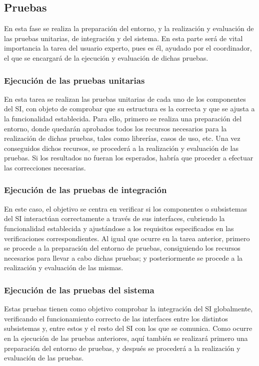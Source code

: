 \documentclass[11pt,a4paper,spanish,twoside]{book}
\begin{document}
\subsection{Pruebas}
En esta fase se realiza la preparación del entorno, y la realización y 
evaluación de las pruebas unitarias, de integración y del sistema. En esta 
parte será de vital importancia la tarea del usuario experto, pues es él, 
ayudado por el coordinador, el que se encargará de la ejecución y evaluación de
dichas pruebas.

\subsubsection{Ejecución de las pruebas unitarias}
En esta tarea se realizan las pruebas unitarias de cada uno de los componentes 
del SI, con objeto de comprobar que su estructura es la correcta y que se 
ajusta a la funcionalidad establecida. Para ello, primero se realiza una 
preparación del entorno, donde quedarán aprobados todos los recursos necesarios
para la realización de dichas pruebas, tales como librerías, casos de uso, etc.
Una vez conseguidos dichos recursos, se procederá a la realización y evaluación
de las pruebas. Si los resultados no fueran los esperados, habría que proceder 
a efectuar las correcciones necesarias.

\subsubsection{Ejecución de las pruebas de integración}
En este caso, el objetivo se centra en verificar si los componentes o 
subsistemas del SI interactúan correctamente a través de sus interfaces, 
cubriendo la funcionalidad establecida y ajustándose a los requisitos 
especificados en las verificaciones correspondientes. Al igual que ocurre en la
tarea anterior, primero se procede a la preparación del entorno de pruebas, 
consiguiendo los recursos necesarios para llevar a cabo dichas pruebas; y 
posteriormente se procede a la realización y evaluación de las mismas.

\subsubsection{Ejecución de las pruebas del sistema}
Estas pruebas tienen como objetivo comprobar la integración del SI globalmente,
verificando el funcionamiento correcto de las interfaces entre los distintos 
subsistemas y, entre estos y el resto del SI con los que se comunica. Como 
ocurre en la ejecución de las pruebas anteriores, aquí también se realizará 
primero una preparación del entorno de pruebas, y después se procederá a la 
realización y evaluación de las pruebas.
\end{document}
